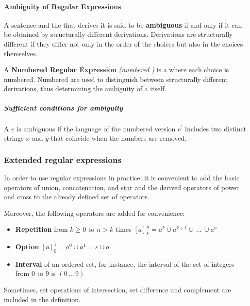 \documentclass[english]{article}
\begin{document}
\paragraph{Ambiguity of Regular Expressions}

A sentence and the \re that derives it is said to be \textbf{ambiguous} if and only if it can be obtained by structurally different derivations.
Derivations are structurally different if they differ not only in the order of the choices but also in the choices themselves.

\begin{definition}
  A \textbf{Numbered Regular Expression} \textit{(numbered \re)} is a \re where each choice is numbered.
  Numbered \re are used to distinguish between structurally different derivations, thus determining the ambiguity of a \re itself.
\end{definition}

\subparagraph*{Sufficient conditions for ambiguity}

A \re \(e\) is ambiguous if the language of the numbered version \(e^\prime\) includes two distinct strings \(x\) and \(y\) that coincide when the numbers are removed.

\subsubsection{Extended regular expressions}

In order to use regular expressions in practice, it is convenient to add the basic operators of union, concatenation, and star and the derived operators of power and cross to the already defined set of operators.

Moreover, the following operators are added for convenience:

\begin{itemize}
  \item \textbf{Repetition} from \(k \geq 0\) to \(n > k\) times \([a]^n_k = a^k \cup a^{k+1} \cup \,\ldots\, \cup a^n\)
  \item \textbf{Option} \([a]^1_0 = a^0 \cup a^1 = \varepsilon \cup a\)
  \item \textbf{Interval} of an ordered set, for instance, the interval of the set of integers from \(0\) to \(9\) is \((0 \,\ldots\, 9)\)
\end{itemize}

Sometimes, set operations of intersection, set difference and complement are included in the definition.
\end{document}
